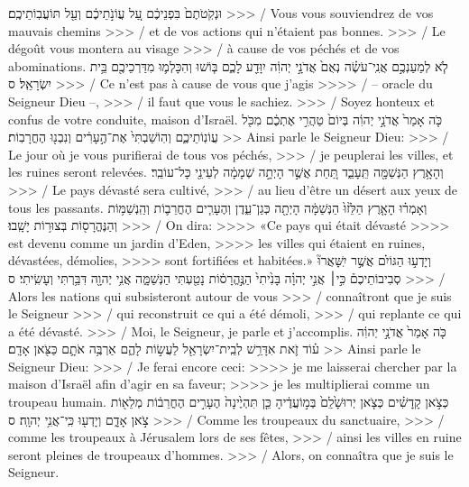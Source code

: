 \begin{paracol}[1]
{    וּנְקֹֽטֹתֶם֙ בִּפְנֵיכֶ֔ם עַ֚ל עֲוֹנֹ֣תֵיכֶ֔ם
    וְעַ֖ל תּוֹעֲבֽוֹתֵיכֶֽם׃}
  {>>> / Vous vous souviendrez de vos mauvais chemins
    >>> / et de vos actions qui n’étaient pas bonnes.
    >>> / Le dégoût vous montera au visage
    >>> / à cause de vos péchés et de vos abominations.}
  \verset
  {לֹ֧א לְמַעַנְכֶ֣ם אֲנִֽי־עֹשֶׂ֗ה
    נְאֻם֙ אֲדֹנָ֣י יְהוִ֔ה
    יִוָּדַ֖ע לָכֶ֑ם
    בּ֧וֹשׁוּ וְהִכָּלְמ֛וּ מִדַּרְכֵיכֶ֖ם בֵּ֥ית יִשְׂרָאֵֽל׃ ס}
  {>>> / Ce n’est pas à cause de vous que j’agis
    >>>> / – oracle du Seigneur Dieu –,
    >>> / il faut que vous le sachiez.
    >>> / Soyez honteux et confus de votre conduite, maison d’Israël.}
  \parSpace
  \verset
  {כֹּ֤ה אָמַר֙ אֲדֹנָ֣י יְהוִ֔ה
    בְּיוֹם֙ טַהֲרִ֣י אֶתְכֶ֔ם מִכֹּ֖ל עֲוֹנֽוֹתֵיכֶ֑ם
    וְהֽוֹשַׁבְתִּי֙ אֶת־הֶ֣עָרִ֔ים וְנִבְנ֖וּ הֶחֳרָבֽוֹת׃}
  {>> Ainsi parle le Seigneur Dieu:
    >>> / Le jour où je vous purifierai de tous vos péchés,
    >>> / je peuplerai les villes, et les ruines seront relevées.}
  \verset
  {וְהָאָ֥רֶץ הַנְּשַׁמָּ֖ה תֵּֽעָבֵ֑ד
    תַּ֚חַת אֲשֶׁ֣ר הָיְתָ֣ה שְׁמָמָ֔ה לְעֵינֵ֖י כָּל־עוֹבֵֽר׃}
  {>>> / Le pays dévasté sera cultivé,
    >>> / au lieu d’être un désert aux yeux de tous les passants.}
  \verset
  {וְאָמְר֗וּ
    הָאָ֤רֶץ הַלֵּ֙זוּ֙ הַנְּשַׁמָּ֔ה
    הָיְתָ֖ה כְּגַן־עֵ֑דֶן
    וְהֶעָרִ֧ים הֶחֳרֵב֛וֹת וְהַֽנְשַׁמּ֥וֹת וְהַנֶּהֱרָס֖וֹת
    בְּצוּר֥וֹת יָשָֽׁבוּ׃}
  {>>> / On dira:
    >>>> «Ce pays qui était dévasté
    >>>> est devenu comme un jardin d’Eden,
    >>>> les villes qui étaient en ruines, dévastées, démolies,
    >>>> sont fortifiées et habitées.»}
  \verset
  {וְיָדְע֣וּ הַגּוֹיִ֗ם אֲשֶׁ֣ר יִֽשָּׁאֲרוּ֘ סְבִיבוֹתֵיכֶם֒
    כִּ֣י׀ אֲנִ֣י יְהוָ֗ה
    בָּנִ֙יתִי֙ הַנֶּ֣הֱרָס֔וֹת
    נָטַ֖עְתִּי הַנְּשַׁמָּ֑ה
    אֲנִ֥י יְהוָ֖ה דִּבַּ֥רְתִּי וְעָשִֽׂיתִי׃ ס}
  {>>> / Alors les nations qui subsisteront autour de vous
    >>> / connaîtront que je suis le Seigneur
    >>> / qui reconstruit ce qui a été démoli,
    >>> / qui replante ce qui a été dévasté.
    >>> / Moi, le Seigneur, je parle et j’accomplis.}
  \parSpace
  \verset
  {כֹּ֤ה אָמַר֙ אֲדֹנָ֣י יְהוִ֔ה
    ע֗וֹד זֹ֛את
    אִדָּרֵ֥שׁ לְבֵֽית־יִשְׂרָאֵ֖ל לַעֲשׂ֣וֹת לָהֶ֑ם
    אַרְבֶּ֥ה אֹתָ֛ם כַּצֹּ֖אן אָדָֽם׃}
  {>> Ainsi parle le Seigneur Dieu:
    >>> / Je ferai encore ceci:
    >>>> je me laisserai chercher par la maison d’Israël afin d’agir en sa faveur;
    >>>> je les multiplierai comme un troupeau humain.}
  \verset
  {כְּצֹ֣אן קָֽדָשִׁ֗ים
    כְּצֹ֤אן יְרוּשָׁ֙לִַם֙ בְּמ֣וֹעֲדֶ֔יהָ
    כֵּ֤ן תִּהְיֶ֙ינָה֙ הֶעָרִ֣ים הֶחֳרֵב֔וֹת מְלֵא֖וֹת צֹ֣אן אָדָ֑ם
    וְיָדְע֖וּ כִּֽי־אֲנִ֥י יְהוָֽה׃ ס}
  {>>> / Comme les troupeaux du sanctuaire,
    >>> / comme les troupeaux à Jérusalem lors de ses fêtes,
    >>> / ainsi les villes en ruine seront pleines de troupeaux d’hommes.
    >>> / Alors, on connaîtra que je suis le Seigneur.}
  \clearpage


\end{paracol}

